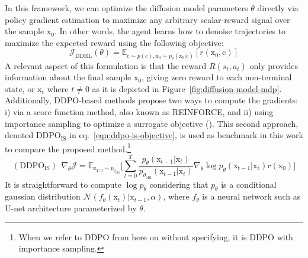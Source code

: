In this framework, we can optimize the diffusion
model parameters $\theta$ directly via policy
gradient estimation to maximize any arbitrary
scalar-reward signal over the sample $\mathrm{x}_{0}$.
In other words, the agent learns how to denoise trajectories to maximize the expected reward using the following objective:
\begin{equation}\label{difusion-rl-objective-1}
  \mathcal{J}_{\text{DDRL}}(\theta)
  = \mathbb{E}_{\mathrm{c}\sim p(\mathrm{c}),  \mathrm{x}_{0}\sim p_{\theta}(\mathrm{x}_{0}|\mathrm{c})}[ r(\mathrm{x}_{0}, \mathrm{c})]
\end{equation}
A relevant aspect of this formulation is that the reward $R(s_{t}, a_{t})$
only provides information about the final sample $\mathrm{x}_{0}$, giving zero
reward to each non-terminal state, or $\mathrm{x}_{t}$ where $t\neq0$ as it is
depicted in Figure~\ref{fig:diffusion-model-mdp}. Additionally, DDPO-based methods propose two ways to compute the gradients: i) via a score function method, also known as REINFORCE, and ii) using importance sampling to optimize a surrogate objective (\citet{schulman2015trust, schulman2017proximal}). This second approach, denoted $\text{DDPO}_{\text{IS}}$ in eq.~\eqref{eqn:ddpo-is-objective}, is used as benchmark in this work to compare the proposed method.\footnote{When we refer to DDPO from here on without specifying, it is DDPO with importance sampling.} 
\begin{equation}\label{eqn:ddpo-is-objective}
  (\text{DDPO}_{\text{IS}})~~ \nabla_{\theta}\mathcal{J} = \mathbb{E}_{\mathrm{x}_{T:0}\sim p_{\theta_{\text{old}}}} \bigg[\sum_{t=0}^{T}\frac{p_{\theta}(\mathrm{x}_{t-1}|\mathrm{x}_{t})}{p_{\theta_{\text{old}}}(\mathrm{x}_{t-1}|\mathrm{x}_{t})}\nabla_{\theta}\log p_{\theta}(\mathrm{x_{t-1}|\mathrm{x}_t}) r(\mathrm{x}_{0})\bigg]
\end{equation}
It is straightforward to compute $\log p_{\theta}$ considering that
$p_{\theta}$ is a conditional gaussian distribution 
$\mathcal{N}(f_{\theta}(\mathrm{x}_{t}) | \mathrm{x}_{t-1}, \alpha)$, where
$f_{\theta}$ is a neural network such as U-net architecture parameterized by $\theta$.

